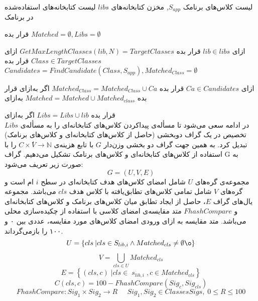   لیست کلاس‌های برنامک $S_{app}$, مخزن کتابخانه‌های $libs$
  لیست کتابخانه‌های استفاده‌شده در برنامک 

 
  قرار بده $Matched=\emptyset ,Libs = \emptyset$ 

 ‌ازای $lib \in libs$ 
 قرار بده $GetMaxLengthClasses‬‬(lib,N)‫‪ = TargetClasses$
‌ازای $Class \in TargetClasses$
 قرار بده  $Candidates = FindCandidate(Class,S_{app}), Matched_{Class} = \emptyset$   

‌ازای $Ca \in Candidates$
 قرار بده $Matched_{Class} = Matched_{Class} \cup {Ca}$
‌اگر
‌به‌ازای
 قرار بده $Matched = Matched \cup Matched_{class}$
‌به‌ازای
 
  قرار‌ بده $Libs = Libs \cup lib$
 ‌اگر
‌به‌ازای\\
 $Libs$
در ادامه سعی می‌شود تا مسأله‌ی پیداکردن کلاس‌های کتابخانه‌ای را به مسأله‌ی تخصیص در یک گراف دوبخشی (حاصل از کلاس‌های کتابخانه‌ای و کلاس‌های برنامک) تبدیل کرد. به همین جهت گراف دو بخشی وزن‌دار  $G$ با تابع هزینه‌ی
 $C\times  ٰV \rightarrow \mathbb{N}$ 
 را با استفاده از کلاس‌های کتابخانه‌ای و کلاس‌های برنامک تشکیل می‌دهیم. گراف G به صورت زیر تعریف می‌شود:
   \begin{equation}
 	G = (U,V,E)
 \end{equation}
 مجموعه‌ی گره‌های $U$ شامل امضای کلاس‌های هدف کتابخانه‌ای در سطح $i$ ام است و گره‌های $V$ شامل تمامی کلاس‌ها‌ی تطابق‌یافته با کلاس هدف $cls$ می‌باشد. مجموعه یال‌های گراف  $E$، حاصل از ایجاد تطابق میان‌ کلاس‌های برنامک و کلاس‌های کتابخانه‌ای و $FhashCompare$ متد مقایسه‌ی امضای کلاسی با استفاده از چکیده‌سازی محلی می‌باشد. متد مقایسه به ازای ورودی امضای کلاس‌های مورد مقایسه، عددی بین ۰ و ۱۰۰ را بازمی‌گرداند.
\begin{equation}
 	U = \left \{ cls \:| cls \in S_{lib,i} \wedge Matched_{cls} \neq \emptyset \o   \right \}
\end{equation}
\begin{equation}
	V = \bigcup_{cls \in U}^{} Matched_{cls}
\end{equation}
\begin{equation}
E= \left \{ (cls,c)\; | cls \in \; s_{lib,i} \; , c \in Matched_{cls} \right \}
\end{equation}
\begin{equation}
	C(cls,c) = 100 - FhashCompare(Sig_{c} , Sig_{cls})
\end{equation}
\begin{equation}
	FhashCompare: Sig_{1} \times Sig_{2} \rightarrow R \;\;\;\;\; Sig_{1} , Sig_{2} \in ClassesSigs, \; 0 \leq R \leq 100
\end{equation}

